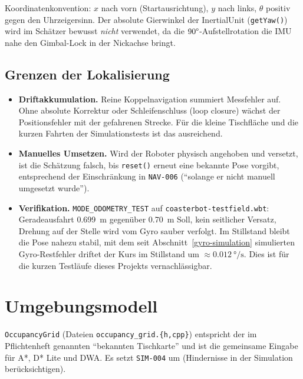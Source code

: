 \documentclass[
  a4paper,
  12pt,
  DIV=12,        %
  parskip=half,  %
  headings=small %
]{scrartcl}
\theoremstyle{definition}
\providecommand{\tightlist}{%
  \setlength{\itemsep}{0pt}\setlength{\parskip}{0pt}}
\theoremstyle{definition}
\begin{document}
Koordinatenkonvention: $x$ nach vorn (Startausrichtung), $y$ nach links,
$\theta$ positiv gegen den Uhrzeigersinn. Der absolute Gierwinkel der
InertialUnit (\texttt{getYaw()}) wird im Schätzer bewusst \emph{nicht}
verwendet, da die $90\degree$-Aufstellrotation die IMU nahe den
Gimbal-Lock in der Nickachse bringt.

\subsection{Grenzen der Lokalisierung}\label{lokalisierung-grenzen}

\begin{itemize}
\tightlist
\item
  \textbf{Driftakkumulation.} Reine Koppelnavigation summiert
  Messfehler auf. Ohne absolute Korrektur oder Schleifenschluss (loop
  closure) wächst der Positionsfehler mit der gefahrenen Strecke. Für
  die kleine Tischfläche und die kurzen Fahrten der Simulationstests ist
  das ausreichend.
\item
  \textbf{Manuelles Umsetzen.} Wird der Roboter physisch angehoben und
  versetzt, ist die Schätzung falsch, bis \texttt{reset()}
  erneut eine bekannte Pose vorgibt, entsprechend der Einschränkung in
  \texttt{NAV-006} (\enquote{solange er nicht manuell umgesetzt wurde}).
\item
  \textbf{Verifikation.} \texttt{MODE\_ODOMETRY\_TEST} auf
  \texttt{coasterbot-testfield.wbt}: Geradeausfahrt \SI{0.699}{\meter}
  gegenüber \SI{0.70}{\meter} Soll, kein seitlicher Versatz,
  Drehung auf der Stelle wird vom Gyro sauber verfolgt. Im Stillstand
  bleibt die Pose nahezu stabil, mit dem seit Abschnitt~\ref{gyro-simulation}
  simulierten Gyro-Restfehler driftet der Kurs im Stillstand um
  $\approx \SI{0.012}{\degree\per\second}$. Dies ist für die kurzen Testläufe
  dieses Projekts vernachlässigbar.
\end{itemize}

\section{Umgebungsmodell}\label{umgebungsmodell}

\texttt{OccupancyGrid} (Dateien \texttt{occupancy\_grid.\{h,cpp\}})
entspricht der im Pflichtenheft genannten \enquote{bekannten Tischkarte}
und ist die gemeinsame Eingabe für A*, D* Lite und DWA\@. Es setzt
\texttt{SIM-004} um (Hindernisse in der Simulation berücksichtigen).
\end{document}
